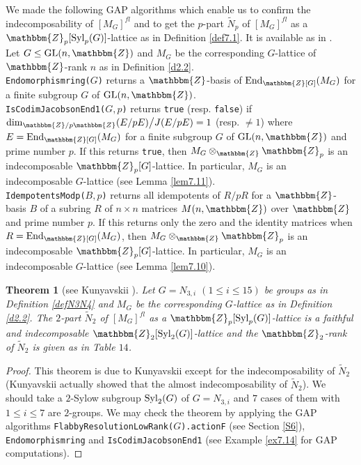 \documentclass{amsart}
\theoremstyle{plain}
\newtheorem{theorem}{Theorem}[section]
\theoremstyle{definition}
\theoremstyle{remark}
\newcommand{\bZ}{\mathbbm{Z}}\newcommand{\bQ}{\mathbbm{Q}}
\newcommand{\GL}{{\rm GL}}\newcommand{\SL}{{\rm SL}}
\newcommand{\Syl}{{\rm Syl}}
\newcounter{sub}\def\tr{\mbox{tr }}
\def\End{\mbox{\rm End}}
\begin{document}
We made the following GAP \cite{GAP} algorithms 
which enable us to confirm the indecomposability of $[M_G]^{fl}$ 
and to get the $p$-part $\widetilde{N}_p$ of $[M_G]^{fl}$ 
as a $\bZ_p[\Syl_p(G)]$-lattice as in Definition \ref{def7.1}. 
It is available as in \cite{BCAlgTori}.\\

Let $G\leq \GL(n,\bZ)$ 
and $M_G$ be the corresponding $G$-lattice of $\bZ$-rank $n$ 
as in Definition \ref{d2.2}.\\

\noindent 
{\tt Endomorphismring(}$G${\tt )} returns a $\bZ$-basis of
$\End_{\bZ[G]}(M_G)$ for a finite subgroup $G$ of $\GL(n,\bZ)$.\\

\noindent 
{\tt IsCodimJacobsonEnd1(}$G,p${\tt )} returns {\tt true} (resp. {\tt false}) 
if ${\rm dim}_{\bZ/p\bZ} (E/pE)\big/J(E/pE)=1$ (resp. $\neq 1$) 
where $E=\End_{\bZ[G]}(M_G)$ 
for a finite subgroup $G$ of $\GL(n,\bZ)$ and prime number $p$. 
If this returns {\tt true}, then $M_G \otimes_\bZ \bZ_p$ 
is an indecomposable $\bZ_p[G]$-lattice. 
In particular, $M_G$ is an indecomposable $G$-lattice 
(see Lemma \ref{lem7.11}).\\

\noindent 
{\tt IdempotentsModp(}$B,p${\tt )} returns all idempotents of $R/pR$ 
for a $\bZ$-basis $B$ of a subring $R$ of $n\times n$ matrices 
$M(n,\bZ)$ over $\bZ$ and prime number $p$. 
If this returns only 
the zero and the identity matrices when $R=\End_{\bZ[G]}(M_G)$, then 
$M_G \otimes_\bZ \bZ_p$ 
is an indecomposable $\bZ_p[G]$-lattice. 
In particular, $M_G$ is an indecomposable $G$-lattice 
(see Lemma \ref{lem7.10}).\\
%
\begin{theorem}[{see Kunyavskii \cite[Section 5]{Kun90}}]\label{th7.12}
Let $G=N_{3,i}$ $(1\leq i\leq 15)$ be groups as in Definition \ref{defN3N4} 
and $M_G$ be the corresponding $G$-lattice as in Definition \ref{d2.2}. 
The $2$-part $\widetilde{N}_2$ of $[M_G]^{fl}$ as a $\bZ_p[\Syl_p(G)]$-lattice 
is a faithful and indecomposable $\bZ_2[\Syl_2(G)]$-lattice 
and the $\bZ_2$-rank of $\widetilde{N}_2$ 
is given as in {\rm Table} $14$. 
\end{theorem}
%
\begin{proof}
This theorem is due to Kunyavskii \cite[Section 5]{Kun90} 
except for the indecomposability of $\widetilde{N}_2$ 
(Kunyavskii actually 
showed that the almost indecomposability of $\widetilde{N}_2$). 
We should take a $2$-Sylow subgroup $\Syl_2(G)$ of $G=N_{3,i}$ 
and $7$ cases of them with $1\leq i\leq 7$ are $2$-groups. 
We may check the theorem by applying the GAP algorithms 
{\tt FlabbyResolutionLowRank($G$).actionF} (see Section \ref{S6}), 
{\tt Endomorphismring} and {\tt IsCodimJacobsonEnd1} 
(see Example \ref{ex7.14} for GAP computations). 
\end{proof}
\end{document}
